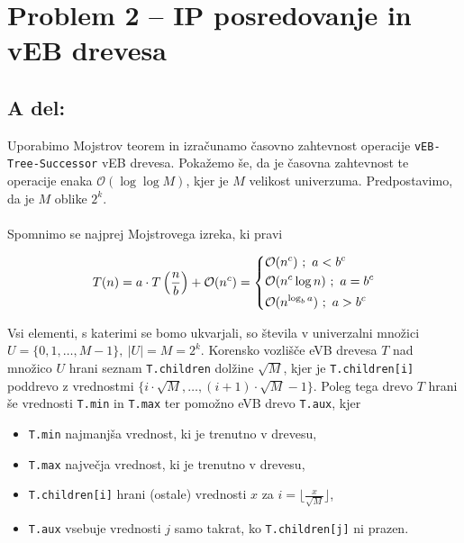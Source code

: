 \documentclass[a4paper,11pt]{article}
\begin{document}

\section*{Problem 2 -- IP posredovanje in vEB drevesa}

\subsection*{A del:}

\noindent
Uporabimo Mojstrov teorem in izračunamo časovno zahtevnost operacije \texttt{vEB-Tree-Successor} vEB drevesa.
Pokažemo še, da je časovna zahtevnost te operacije enaka $\mathcal{O}(\log \log M)$, kjer je $M$ velikost univerzuma. Predpostavimo, da je $M$ oblike $2^k$.
\\
\\
Spomnimo se najprej Mojstrovega izreka, ki pravi

\begin{align}\label{master}
T(n) = a \cdot T \left( \frac{n}{b} \right) + \mathcal{O}(n^c) = 
    \begin{dcases*} 
        \mathcal{O}(n^c) \ ; \ a < b^c \\ 
        \mathcal{O}(n^c \log n) \ ; \ a = b^c \\ 
        \mathcal{O}(n^{\log_b a}) \ ; \ a > b^c  
    \end{dcases*} 
\end{align}

\noindent
Vsi elementi, s katerimi se bomo ukvarjali, so števila v univerzalni množici $U = \{ 0, 1, \ldots, M - 1\}, \ |U| = M = 2^k$.
Korensko vozlišče eVB drevesa $T$ nad množico $U$ hrani seznam \texttt{T.children} dolžine $\sqrt{M}$, kjer je \texttt{T.children[i]} poddrevo z vrednostmi $\{ i \cdot \sqrt{M}, \ldots, (i + 1) \cdot \sqrt{M} - 1\}$.
Poleg tega drevo $T$ hrani še vrednosti \texttt{T.min} in \texttt{T.max} ter pomožno eVB drevo \texttt{T.aux}, kjer

\begin{itemize}
    \item \texttt{T.min} najmanjša vrednost, ki je trenutno v drevesu,
    \item \texttt{T.max} največja vrednost, ki je trenutno v drevesu,
    \item \texttt{T.children[i]} hrani (ostale) vrednosti $x$ za $i =  \lfloor \frac{x}{\sqrt{M}} \rfloor$,
    \item \texttt{T.aux} vsebuje vrednosti $j$ samo takrat, ko \texttt{T.children[j]} ni prazen.
\end{itemize}
\end{document}
